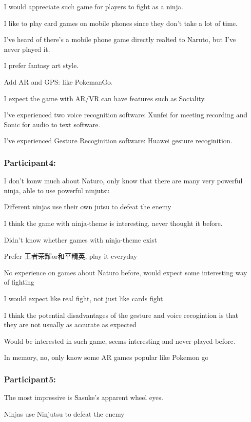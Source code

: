 \documentclass[UTF8,a4paper,12pt]{ctexart}
\numberwithin{equation}{section}
\begin{document}
I would appreciate such game for players to fight as a ninja.

I like to play card games on mobile phones since they don't take a lot of time.

I've heard of there's a mobile phone game directly realted to Naruto, but I've never played it.

I prefer fantasy art style.

Add AR and GPS: like PokemanGo.

I expect the game with AR/VR can have features such as Sociality.

I've experienced two voice recognition software: Xunfei for meeting recording and Sonic for audio to text software.

I've experienced Gesture Recoginition software: Huawei gesture recoginition.

\subsubsection*{Participant4:}
I don't konw much about Naturo, only know that there are many very powerful ninja, able to use powerful ninjutsu

Different ninjas use their own jutsu to defeat the enemy

I think the game with ninja-theme is interesting, never thought it before.

Didn't know whether games with ninja-theme exist

Prefer 王者荣耀or和平精英, play it everyday

No experience on games about Naturo before,  would expect some interesting way of fighting

I would expect like real fight, not just like cards fight

I think the potential disadvantages of the gesture and voice recogintion is that they are not usually as accurate as expected

Would be interested in such game, seems interesting and never played before.

In memory, no, only know some AR games popular like Pokemon go

\subsubsection*{Participant5:}
The most impressive is Sasuke's apparent wheel eyes.

Ninjas use Ninjutsu to defeat the enemy
\end{document}
